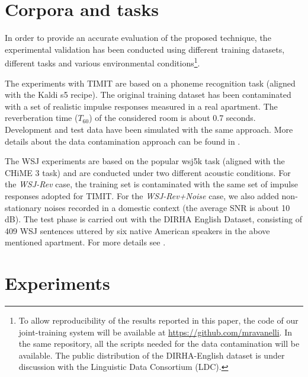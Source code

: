 \documentclass{article}
\begin{document}
\section{Corpora and tasks}
\label{sec:corpora}
In order to provide an accurate evaluation of the proposed technique, the experimental validation has been conducted using different training datasets, different tasks and various environmental conditions\footnote{To allow reproducibility of the results reported in this paper,  the code of our joint-training system will be available at \url{https://github.com/mravanelli}. In the same repository, all the scripts needed for the data contamination will be available. The public distribution of the DIRHA-English dataset is under discussion with the Linguistic Data Consortium (LDC).}. 

The experiments with TIMIT are based on a phoneme recognition task (aligned with the Kaldi s5 recipe). The original training dataset has been contaminated with a set of realistic impulse responses measured in a real apartment. The reverberation time ($T_{60}$) of the considered room is about 0.7 seconds. Development and test data have been simulated with the same approach. More details about the data contamination approach can be found in \cite{IRs_paper,lrec,rav_is16}.

The WSJ experiments are based on the popular wsj5k task (aligned with the CHiME 3 \cite{chime3} task) and are conducted under two different acoustic conditions. For the \textit{WSJ-Rev} case, the training set is contaminated with the same set of impulse responses adopted for TIMIT. For the \textit{WSJ-Rev+Noise} case, we also added non-stationary noises recorded in a domestic context (the average SNR is about 10 dB). The test phase is carried out with the DIRHA English Dataset, consisting of 409 WSJ sentences uttered by six native American speakers in the above mentioned apartment. For more details see \cite{dirha_asru,rav_is16}. 



\section{Experiments}
\end{document}
